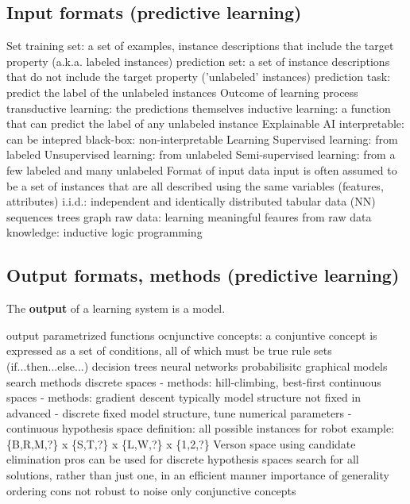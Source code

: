 \subsection{Input formats (predictive learning)}
\begin{outline}
    \1 Set
        \2 training set: a set of examples, instance descriptions that include the target property (a.k.a. labeled instances)
        \2 prediction set: a set of instance descriptions that do not include the target property ('unlabeled' instances)
        \2 prediction task: predict the label of the unlabeled instances
    \1 Outcome of learning process
        \2 transductive learning: the predictions themselves
        \2 inductive learning: a function that can predict the label of any unlabeled instance
    \1 Explainable AI
        \2 interpretable: can be intepred
        \2 black-box: non-interpretable
    \1 Learning
        \2 Supervised learning: from labeled
        \2 Unsupervised learning: from unlabeled
        \2 Semi-supervised learning: from a few labeled and many unlabeled
    \1 Format of input data
        \2 input is often assumed to be a set of instances that are all described using the same variables (features, attributes)
        \2 i.i.d.: independent and identically distributed
            \3 tabular data (NN)
            \3 sequences
            \3 trees
            \3 graph
            \3 raw data: learning meaningful feaures from raw data
            \3 knowledge: inductive logic programming
\end{outline}

\subsection{Output formats, methods (predictive learning)}
The \textbf{output} of a learning system is a model.
\begin{outline}
    \1 output
        \2 parametrized functions
        \2 ocnjunctive concepts: a conjuntive concept is expressed as a set of conditions, all of which must be true
        \2 rule sets (if...then...else...)
        \2 decision trees
        \2 neural networks
        \2 probabilisitc graphical models
    \1 search methods
        \2 discrete spaces - methods: hill-climbing, best-first
        \2 continuous spaces - methods: gradient descent
    \1 typically
        \2 model structure not fixed in advanced - discrete
        \2 fixed model structure, tune numerical parameters - continuous
    \1 hypothesis space
        \2 definition: all possible instances
        \2 for robot example: \{B,R,M,?\} x \{S,T,?\} x \{L,W,?\} x \{1,2,?\}
    \1 Verson space
        \2 using candidate elimination
        \2 pros
            \3 can be used for discrete hypothesis spaces
            \3 search for all solutions, rather than just one, in an efficient manner
            \3 importance of generality ordering
        \2 cons
            \3 not robust to noise
            \3 only conjunctive concepts
\end{outline}
\pagebreak

